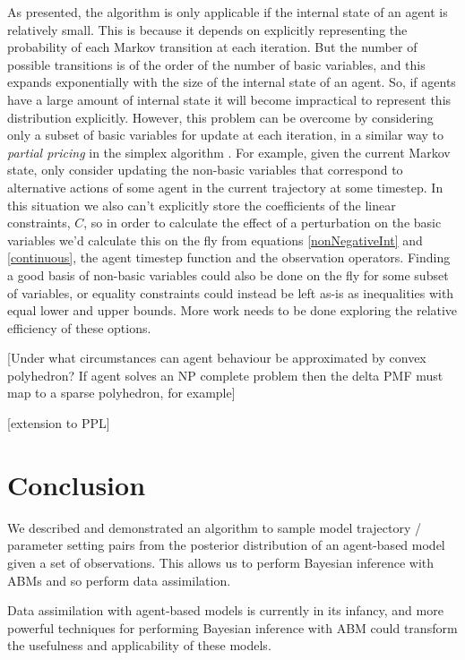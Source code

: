 \documentclass{article}
\begin{document}
As presented, the algorithm is only applicable if the internal state of an agent is relatively small. This is because it depends on explicitly representing the probability of each Markov transition at each iteration. But the number of possible transitions is of the order of the number of basic variables, and this expands exponentially with the size of the internal state of an agent. So, if agents have a large amount of internal state it will become impractical to represent this distribution explicitly. However, this problem can be overcome by considering only a subset of basic variables for update at each iteration, in a similar way to \textit{partial pricing} in the simplex algorithm \citep{maros2002computational}. For example, given the current Markov state, only consider updating the non-basic variables that correspond to alternative actions of some agent in the current trajectory at some timestep. In this situation we also can't explicitly store the coefficients of the linear constraints, $C$, so in order to calculate the effect of a perturbation on the basic variables we'd calculate this on the fly from equations \eqref{nonNegativeInt} and \eqref{continuous}, the agent timestep function and the observation operators. Finding a good basis of non-basic variables could also be done on the fly for some subset of variables, or equality constraints could instead be left as-is as inequalities with equal lower and upper bounds. More work needs to be done exploring the relative efficiency of these options.

[Under what circumstances can agent behaviour be approximated by convex polyhedron? If agent solves an NP complete problem then the delta PMF must map to a sparse polyhedron, for example]

[extension to PPL]

\section{Conclusion}\label{sec:conclusion}

We described and demonstrated an algorithm to sample model trajectory / parameter setting pairs from the posterior distribution of an agent-based model given a set of observations. This allows us to  perform Bayesian inference with ABMs and so perform data assimilation.

Data assimilation with agent-based models is currently in its infancy, and more powerful techniques for performing Bayesian inference with ABM could transform the usefulness and applicability of these models.
\end{document}
